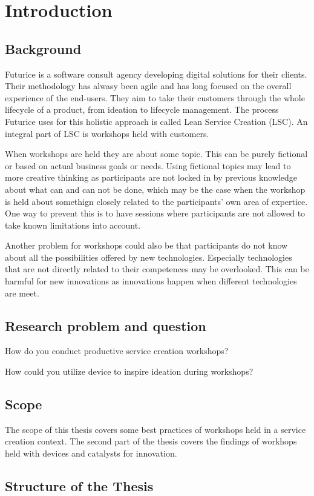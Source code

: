 \chapter{Introduction}
\label{chapter:intro}

\section{Background}
\label{section:background}

Futurice is a software consult agency developing digital solutions for their clients. Their methodology has alwasy been agile and has long focused on the overall experience of the end-users. They aim to take their customers through the whole lifecycle of a product, from ideation to lifecycle management. The process Futurice uses for this holistic approach is called Lean Service Creation (LSC). An integral part of LSC is workshops held with customers.

When workshops are held they are about some topic. This can be purely fictional or based on actual business goals or needs. Using fictional topics may lead to more creative thinking as participants are not locked in by previous knowledge about what can and can not be done, which may be the case when the workshop is held about somethign closely related to the participants' own area of expertice. One way to prevent this is to have sessions where participants are not allowed to take known limitations into account.

Another problem for workshops could also be that participants do not know about all the possibilities offered by new technologies. Especially technologies that are not directly related to their competences may be overlooked. This can be harmful for new innovations as innovations happen when different technologies are meet.





\section{Research problem and question}
\label{section:problem}

How do you conduct productive service creation workshops?

How could you utilize device to inspire ideation during workshops?

\section{Scope}
\label{section:scope}

The scope of this thesis covers some best practices of workshops held in a service creation context. The second part of the thesis covers the findings of workhops held with devices and catalysts for innovation.


\section{Structure of the Thesis}
\label{section:structure}
